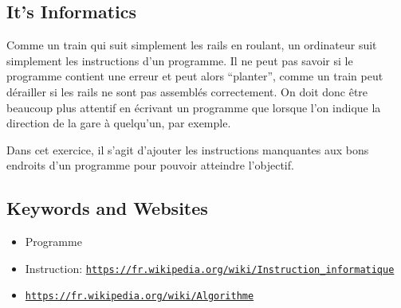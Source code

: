 \documentclass[a4paper,11pt]{report}
\newcommand{\BrochureUrlText}[1]{\texttt{#1}}
\begin{document}
\subsection*{It’s Informatics}

Comme un train qui suit simplement les rails en roulant, un ordinateur suit simplement les instructions d’un programme. Il ne peut pas savoir si le programme contient une erreur et peut alors “planter”, comme un train peut dérailler si les rails ne sont pas assemblés correctement. On doit donc être beaucoup plus attentif en écrivant un programme que lorsque l’on indique la direction de la gare à quelqu’un, par exemple.

Dans cet exercice, il s’agit d’ajouter les instructions manquantes aux bons endroits d’un programme pour pouvoir atteindre l’objectif.

{\raggedright

\subsection*{Keywords and Websites}

\begin{itemize}
  \item Programme
  \item Instruction: \href{https://fr.wikipedia.org/wiki/Instruction_informatique}{\BrochureUrlText{https://fr.wikipedia.org/wiki/Instruction\_informatique}}
  \item \href{https://fr.wikipedia.org/wiki/Algorithme}{\BrochureUrlText{https://fr.wikipedia.org/wiki/Algorithme}}
\end{itemize}


}
\end{document}
